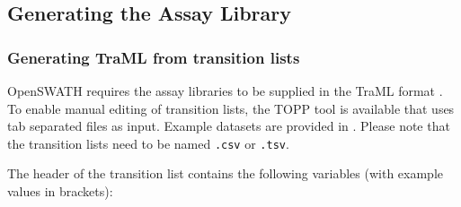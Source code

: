 \subsection{Generating the Assay Library}
\subsubsection{Generating TraML from transition lists}
OpenSWATH requires the assay libraries to be supplied in the TraML format \cite{Deutsch2012TraMLA}. To enable manual editing of transition lists, the TOPP tool  is available that uses tab separated files as input. Example datasets are provided in . Please note that the transition lists need to be named \texttt{.csv} or \texttt{.tsv}.

The header of the transition list contains the following variables (with example values in brackets):

